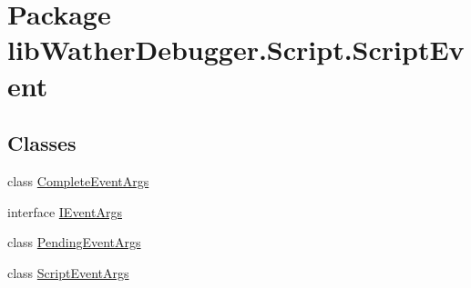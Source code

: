 \hypertarget{namespacelib_wather_debugger_1_1_script_1_1_script_event}{\section{Package lib\+Wather\+Debugger.\+Script.\+Script\+Event}
\label{namespacelib_wather_debugger_1_1_script_1_1_script_event}
}
\subsection*{Classes}
\begin{DoxyCompactItemize}
\item 
class \hyperlink{classlib_wather_debugger_1_1_script_1_1_script_event_1_1_complete_event_args}{Complete\+Event\+Args}
\item 
interface \hyperlink{interfacelib_wather_debugger_1_1_script_1_1_script_event_1_1_i_event_args}{I\+Event\+Args}
\item 
class \hyperlink{classlib_wather_debugger_1_1_script_1_1_script_event_1_1_pending_event_args}{Pending\+Event\+Args}
\item 
class \hyperlink{classlib_wather_debugger_1_1_script_1_1_script_event_1_1_script_event_args}{Script\+Event\+Args}
\end{DoxyCompactItemize}
